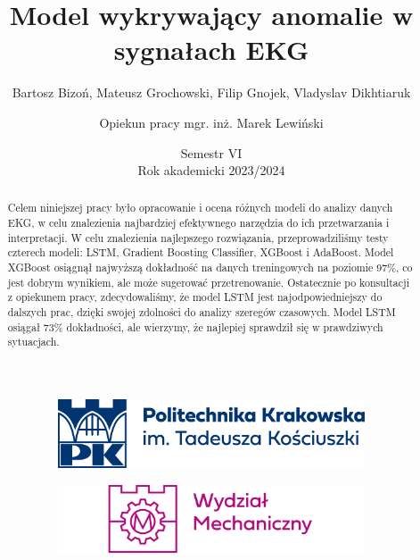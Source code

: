 \documentclass[12pt,a4paper]{article}
\title{\huge{Model wykrywający anomalie w sygnałach EKG } }
\author{Bartosz Bizoń, Mateusz Grochowski, Filip Gnojek, Vladyslav Dikhtiaruk
\and \small{Opiekun pracy mgr. inż. Marek Lewiński}}
\date{Semestr VI \\ Rok akademicki 2023/2024}
\begin{document}
\begin{figure}
    \begin{subfigure}{.49\textwidth}
      \includegraphics[width=.7\linewidth]{images/PK_POZIOM_RGB.png}
      \centering
    \end{subfigure}
    \begin{subfigure}{.49\textwidth}
      \includegraphics[width=.7\linewidth]{WM_RGB.png}
      \centering
    \end{subfigure}
\end{figure}
\maketitle


\begin{abstract} 

Celem niniejszej pracy było opracowanie i ocena różnych modeli do analizy danych EKG, w celu znalezienia najbardziej efektywnego narzędzia do ich przetwarzania i interpretacji. W celu znalezienia najlepszego rozwiązania, przeprowadziliśmy testy czterech modeli: LSTM, Gradient Boosting Classifier, XGBoost i AdaBoost. Model XGBoost osiągnął najwyższą dokładność na danych treningowych na poziomie 97\%, co jest dobrym wynikiem, ale może sugerować przetrenowanie. Ostatecznie po konsultacji z opiekunem pracy, zdecydowaliśmy, że model LSTM jest najodpowiedniejszy do dalszych prac, dzięki swojej zdolności do analizy szeregów czasowych. Model LSTM osiągał 73\% dokładności, ale wierzymy, że najlepiej sprawdził się w prawdziwych sytuacjach.

\end{abstract}
\end{document}
